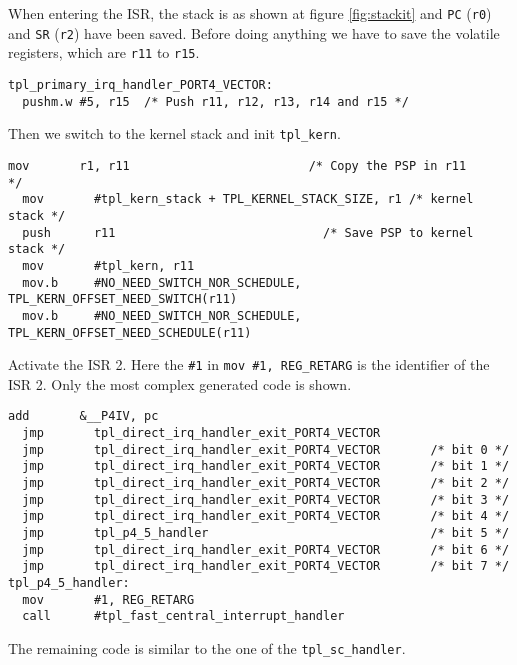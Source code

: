 \documentclass[11pt, oneside]{article}   	%
\begin{document}
When entering the ISR, the stack is as shown at figure \ref{fig:stackit} and \lstinline{PC} (\lstinline{r0}) and \lstinline{SR} (\lstinline{r2}) have been saved. Before doing anything we have to save the volatile registers, which are \lstinline{r11} to \lstinline{r15}.

\begin{lstlisting}[basicstyle=\footnotesize\ttfamily]
tpl_primary_irq_handler_PORT4_VECTOR:
  pushm.w #5, r15  /* Push r11, r12, r13, r14 and r15 */
\end{lstlisting}

Then we switch to the kernel stack and init \lstinline{tpl_kern}.

\begin{lstlisting}[basicstyle=\footnotesize\ttfamily]
  mov       r1, r11                         /* Copy the PSP in r11      */
  mov       #tpl_kern_stack + TPL_KERNEL_STACK_SIZE, r1 /* kernel stack */
  push      r11                             /* Save PSP to kernel stack */
  mov       #tpl_kern, r11
  mov.b     #NO_NEED_SWITCH_NOR_SCHEDULE, TPL_KERN_OFFSET_NEED_SWITCH(r11)
  mov.b     #NO_NEED_SWITCH_NOR_SCHEDULE, TPL_KERN_OFFSET_NEED_SCHEDULE(r11)
\end{lstlisting}

Activate the ISR 2. Here the \lstinline{#1} in \lstinline{mov #1, REG_RETARG} is the identifier of the ISR 2. Only the most complex generated code is shown.

\begin{lstlisting}[basicstyle=\footnotesize\ttfamily]
  add       &__P4IV, pc
  jmp       tpl_direct_irq_handler_exit_PORT4_VECTOR
  jmp       tpl_direct_irq_handler_exit_PORT4_VECTOR       /* bit 0 */
  jmp       tpl_direct_irq_handler_exit_PORT4_VECTOR       /* bit 1 */
  jmp       tpl_direct_irq_handler_exit_PORT4_VECTOR       /* bit 2 */
  jmp       tpl_direct_irq_handler_exit_PORT4_VECTOR       /* bit 3 */
  jmp       tpl_direct_irq_handler_exit_PORT4_VECTOR       /* bit 4 */
  jmp       tpl_p4_5_handler                               /* bit 5 */
  jmp       tpl_direct_irq_handler_exit_PORT4_VECTOR       /* bit 6 */
  jmp       tpl_direct_irq_handler_exit_PORT4_VECTOR       /* bit 7 */
tpl_p4_5_handler:
  mov       #1, REG_RETARG
  call      #tpl_fast_central_interrupt_handler
\end{lstlisting}

The remaining code is similar to the one of the \lstinline{tpl_sc_handler}.
\end{document}
